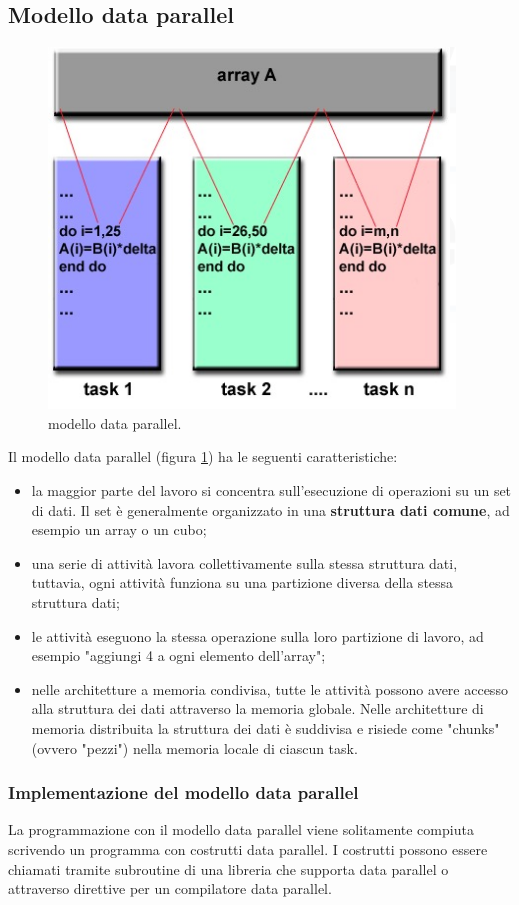 \subsection{Modello data parallel}
\begin{figure}[th]
	\centering
	\includegraphics[width=0.7\linewidth]{img/modello-parallelo-dei-dati}
	\caption{modello data parallel.}
	\label{fig:modello-parallelo-dei-dati}
\end{figure}
Il modello data parallel (figura \ref{fig:modello-parallelo-dei-dati}) ha le seguenti caratteristiche:
\begin{itemize}
	\item la maggior parte del lavoro si concentra sull'esecuzione di operazioni su un set di dati. Il set è generalmente organizzato in una \textbf{struttura  dati comune}, ad esempio un array o un cubo;
	\item una serie di attività lavora collettivamente sulla stessa struttura dati, tuttavia, ogni attività funziona su una partizione diversa della stessa struttura dati;
	\item le attività eseguono la stessa operazione sulla loro partizione di lavoro, ad esempio "aggiungi 4 a ogni elemento dell'array";
	\item nelle architetture a memoria condivisa, tutte le attività possono avere accesso alla struttura dei dati attraverso la memoria globale. Nelle architetture di memoria distribuita la struttura dei dati è suddivisa e risiede come "chunks" (ovvero "pezzi") nella memoria locale di ciascun task.
\end{itemize}

\subsubsection{Implementazione del modello data parallel} La programmazione con il modello data parallel viene solitamente compiuta scrivendo un programma con costrutti data parallel. I costrutti possono essere chiamati tramite subroutine di una libreria che supporta data parallel o attraverso direttive per un compilatore data parallel.


